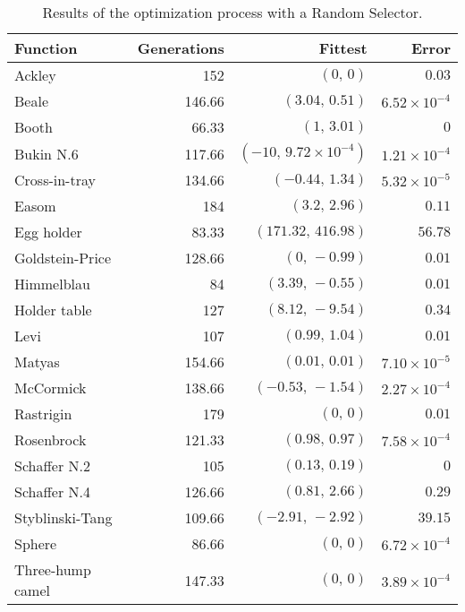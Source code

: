     \begin{table}[H]
      \centering
      \begin{tabular}{|l|r|r|r|}
        \hline
        Function  & Generations & Fittest 
          & Error \\
        \hline\hline
        Ackley	& 152	& \((0,\, 0)\)	& \(0.03\)\\\hline
        Beale	& 146.66	& \((3.04,\, 0.51)\)	& \(6.52 \times 10^{-4}\)\\\hline
        Booth	& 66.33	& \((1,\, 3.01)\)	& \(0\)\\\hline
        Bukin N.6	& 117.66	& \((-10,\, 9.72 \times 10^{-4})\)	& \(1.21 \times 10^{-4}\)\\\hline
        Cross-in-tray	& 134.66	& \((-0.44,\, 1.34)\)	& \(5.32 \times 10^{-5}\)\\\hline
        Easom	& 184	& \((3.2,\, 2.96)\)	& \(0.11\)\\\hline
        Egg holder	& 83.33	& \((171.32,\, 416.98)\)	& \(56.78\)\\\hline
        Goldstein-Price	& 128.66	& \((0,\, -0.99)\)	& \(0.01\)\\\hline
        Himmelblau	& 84	& \((3.39,\, -0.55)\)	& \(0.01\)\\\hline
        Holder table	& 127	& \((8.12,\, -9.54)\)	& \(0.34\)\\\hline
        Levi	& 107	& \((0.99,\, 1.04)\)	& \(0.01\)\\\hline
        Matyas	& 154.66	& \((0.01,\, 0.01)\)	& \(7.10 \times 10^{-5}\)\\\hline
        McCormick	& 138.66	& \((-0.53,\, -1.54)\)	& \(2.27 \times 10^{-4}\)\\\hline
        Rastrigin	& 179	& \((0,\, 0)\)	& \(0.01\)\\\hline
        Rosenbrock	& 121.33	& \((0.98,\, 0.97)\)	& \(7.58 \times 10^{-4}\)\\\hline
        Schaffer N.2	& 105	& \((0.13,\, 0.19)\)	& \(0\)\\\hline
        Schaffer N.4	& 126.66	& \((0.81,\, 2.66)\)	& \(0.29\)\\\hline
        Styblinski-Tang	& 109.66	& \((-2.91,\, -2.92)\)	& \(39.15\)\\\hline
        Sphere	& 86.66	& \((0,\, 0)\)	& \(6.72 \times 10^{-4}\)\\\hline
        Three-hump camel	& 147.33	& \((0,\, 0)\)	& \(3.89 \times 10^{-4}\)
        \\\hline
      \end{tabular}
      \caption{Results of the optimization process with a Random Selector.}
    \end{table}

